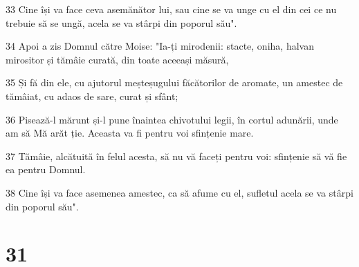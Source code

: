 \par 33 Cine își va face ceva asemănător lui, sau cine se va unge cu el din cei ce nu trebuie să se ungă, acela se va stârpi din poporul său".
\par 34 Apoi a zis Domnul către Moise: "Ia-ți mirodenii: stacte, oniha, halvan mirositor și tămâie curată, din toate aceeași măsură,
\par 35 Și fă din ele, cu ajutorul meșteșugului făcătorilor de aromate, un amestec de tămâiat, cu adaos de sare, curat și sfânt;
\par 36 Pisează-l mărunt și-l pune înaintea chivotului legii, în cortul adunării, unde am să Mă arăt ție. Aceasta va fi pentru voi sfințenie mare.
\par 37 Tămâie, alcătuită în felul acesta, să nu vă faceți pentru voi: sfințenie să vă fie ea pentru Domnul.
\par 38 Cine își va face asemenea amestec, ca să afume cu el, sufletul acela se va stârpi din poporul său".

\chapter{31}

